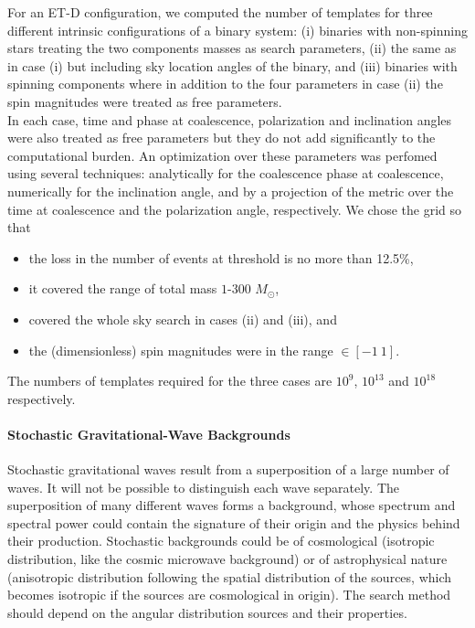 {
For an ET-D configuration, we computed the number of templates for three 
different intrinsic configurations of a binary system: 
(i) binaries with non-spinning stars treating the two components masses
as search parameters, (ii) the same as in case (i) but including 
sky location angles of the binary, and (iii) binaries with spinning components 
where in addition to the four parameters in case (ii) the 
spin magnitudes were treated  as free parameters.
\\[5pt]
In each case, time and phase at coalescence, polarization and inclination 
angles were also treated as free parameters but they do not add significantly
to the computational burden. An optimization over these parameters 
was perfomed using several techniques: analytically for the coalescence phase at 
coalescence, numerically for the inclination angle, and by a projection of the metric 
over the time at coalescence and the polarization angle, respectively.
We chose the grid so that
\\[5pt]
\begin{itemize}
\item the loss in the number of events at threshold is no more than 12.5\%,
\item it covered the range of total mass $1$-$300$ $M_\odot$, 
\item covered the whole sky search in cases (ii) and (iii), and
\item the (dimensionless) spin magnitudes were in the range $\in [-1~1]$. 
\end{itemize} 
The numbers of templates required for the three cases are $10^9$, $10^{13}$ and 
$10^{18}$ respectively. 
}




\paragraph{Stochastic Gravitational-Wave Backgrounds}  
Stochastic gravitational waves result from a superposition of 
a large number of waves. It will not be possible to distinguish
each wave separately. The superposition of many different waves 
forms a background, whose spectrum and spectral power could contain
the signature of their origin and the physics behind their 
production. Stochastic backgrounds could be of cosmological 
(isotropic distribution, like the cosmic microwave background) 
or of astrophysical nature (anisotropic distribution following 
the spatial distribution of the sources, which becomes isotropic
if the sources are cosmological in origin). The search method 
should depend on the angular distribution sources and their 
properties\cite{THRANE2009}. 

